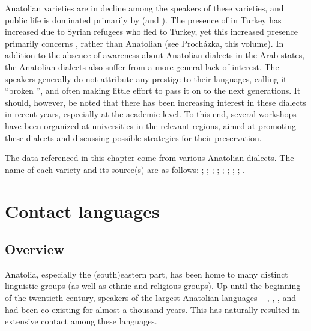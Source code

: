\documentclass[output=paper]{langsci/langscibook}
\begin{document}
Anatolian  varieties are in decline among the speakers of these varieties, and public life is dominated primarily by  (and ). The presence of  in Turkey has increased due to Syrian refugees who fled to Turkey, yet this increased presence primarily concerns  , rather than Anatolian  (see Proch\'{a}zka, this volume). In addition to the absence of awareness about Anatolian  dialects in the Arab states, the Anatolian dialects also suffer from a more general lack of interest. The speakers generally do not attribute any {prestige} to their languages, calling it ``broken '', and often making little effort to pass it on to the next generations. It should, however, be noted that there has been increasing interest in these dialects in recent years, especially at the academic level. To this end, several workshops have been organized at universities in the relevant regions, aimed at promoting these dialects and discussing possible strategies for their preservation.

The data referenced in this chapter come from various Anatolian  dialects. The name of each variety and its source(s) are as follows:  \citep{Wittrich2001};  \citep{Jastrow1973};  \citep{Talay2007};  \citep{Talay2001,Talay2002};  \citep{Jastrow1978};    \citep{Jastrow2006,Grigore2007article,GrigoreBituna2012};  \citep{Akkus2016,Akkus2017,Isaksson2005};  \citep{Bituna2016,GrigoreBituna2012};  \citep{Lahdo2009}.

\section{Contact languages}

\subsection{Overview}
{Anatolia}, especially the (south)eastern part, has been home to many distinct linguistic groups (as well as ethnic and religious groups). Up until the beginning of the twentieth century, speakers of the largest Anatolian languages -- , , ,  and  -- had been co-existing for almost a thousand years. This has naturally resulted in extensive contact among these languages.
\end{document}
